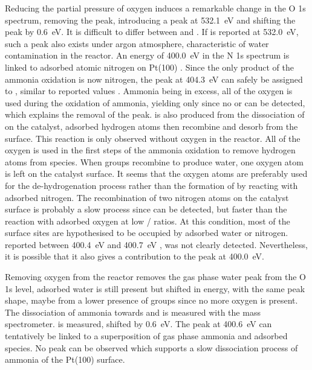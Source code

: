 Reducing the partial pressure of oxygen induces a remarkable change in the O 1s spectrum, removing the  peak, introducing a  peak at \qty{532.1}{\eV} and shifting the  peak by \qty{0.6}{\eV}.
It is difficult to differ between  and .
If  is reported at \qty{532.0}{\eV}, such a peak also exists under argon atmosphere, characteristic of water contamination in the reactor.
An energy of \qty{400.0}{\eV} in the N 1s spectrum is linked to adsorbed atomic nitrogen on Pt(100) \parencite{Sugai1993, vandenBroek1999}.
Since the only product of the ammonia oxidation is now nitrogen, the peak at \qty{404.3}{\eV} can safely be assigned to , similar to reported values \parencite{Ivashenko2021}.
Ammonia being in excess, all of the oxygen is used during the oxidation of ammonia, yielding only  since no  or  can be detected, which explains the removal of the  peak.
 is also produced from the dissociation of  on the catalyst, adsorbed hydrogen atoms then recombine and desorb from the surface.
This reaction is only observed without oxygen in the reactor.
All of the oxygen is used in the first steps of the ammonia oxidation to remove hydrogen atoms from  species.
When  groups recombine to produce water, one oxygen atom is left on the catalyst surface.
It seems that the oxygen atoms are preferably used for the de-hydrogenation process rather than the formation of  by reacting with adsorbed nitrogen.
The recombination of two nitrogen atoms on the catalyst surface is probably a slow process since  can be detected, but faster than the reaction with adsorbed oxygen at low / ratios.
At this condition, most of the surface sites are hypothesised to be occupied by adsorbed water or nitrogen.
 reported between \qty{400.4}{\eV} and \qty{400.7}{\eV} \parencite{Ivashenko2021}, was not clearly detected.
Nevertheless, it is possible that it also gives a contribution to the peak at \qty{400.0}{\eV}.

Removing oxygen from the reactor removes the gas phase water peak from the O 1s level, adsorbed water is still present but shifted in energy, with the same peak shape, maybe from a lower presence of  groups since no more oxygen is present.
The dissociation of ammonia towards  and  is measured with the mass spectrometer.
 is measured, shifted by \qty{0.6}{\eV}.
The peak at \qty{400.6}{\eV} can tentatively be linked to a superposition of gas phase ammonia and adsorbed  species.
No  peak can be observed which supports a slow dissociation process of ammonia of the Pt(100) surface.

